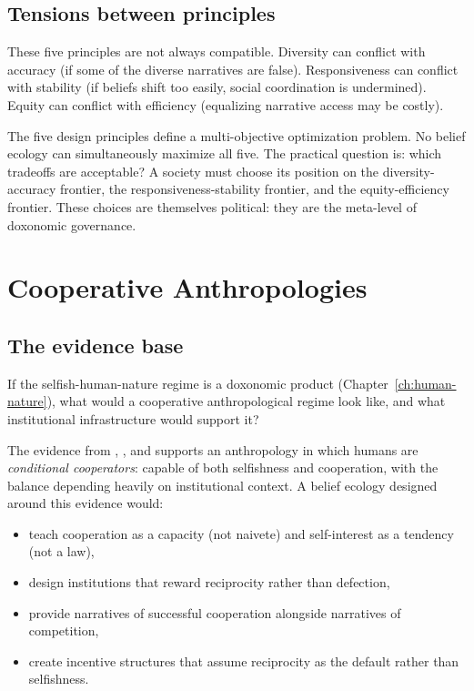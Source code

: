 \subsection{Tensions between principles}

These five principles are not always compatible.
Diversity can conflict with accuracy (if some of the diverse narratives are false).
Responsiveness can conflict with stability (if beliefs shift too easily, social coordination is undermined).
Equity can conflict with efficiency (equalizing narrative access may be costly).

\begin{proposition}
\label{prop:design-tradeoffs}
The five design principles define a multi-objective optimization problem.
No belief ecology can simultaneously maximize all five.
The practical question is: which tradeoffs are acceptable?
A society must choose its position on the diversity-accuracy frontier, the responsiveness-stability frontier, and the equity-efficiency frontier.
These choices are themselves political: they are the meta-level of doxonomic governance.
\end{proposition}

\section{Cooperative Anthropologies}
\label{sec:ch33-cooperative}

\subsection{The evidence base}

If the selfish-human-nature regime is a doxonomic product (Chapter~\ref{ch:human-nature}), what would a cooperative anthropological regime look like, and what institutional infrastructure would support it?

The evidence from \textcite{bowles2011}, \textcite{ostrom1990}, and \textcite{nowak2006} supports an anthropology in which humans are \emph{conditional cooperators}: capable of both selfishness and cooperation, with the balance depending heavily on institutional context.
A belief ecology designed around this evidence would:
\begin{itemize}[nosep]
  \item teach cooperation as a capacity (not naivete) and self-interest as a tendency (not a law),
  \item design institutions that reward reciprocity rather than defection,
  \item provide narratives of successful cooperation alongside narratives of competition,
  \item create incentive structures that assume reciprocity as the default rather than selfishness.
\end{itemize}

